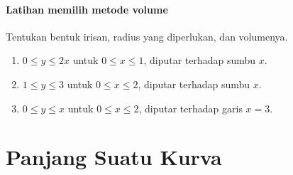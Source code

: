 \documentclass{../../kalkulus-ppt}
\begin{document}
\begin{frame}{\insertsection}
    \framesubtitle{Latihan memilih metode volume}
    \begin{latihan}
        Tentukan bentuk irisan, radius yang diperlukan, dan volumenya.
        \begin{enumerate}
            \item $0\le y\le2x$ untuk $0\le x\le1$, diputar terhadap sumbu $x$.
            \item $1\le y\le3$ untuk $0\le x\le2$, diputar terhadap sumbu $x$.
            \item $0\le y\le x$ untuk $0\le x\le2$, diputar terhadap garis $x=3$.
        \end{enumerate}
    \end{latihan}
\end{frame}

\section{Panjang Suatu Kurva}
\end{document}
